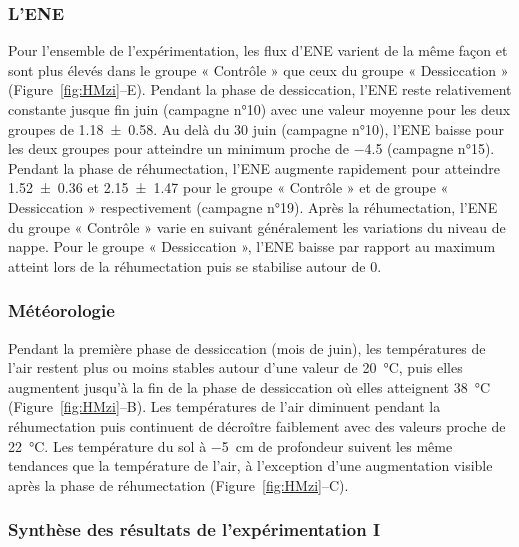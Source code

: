 \subsubsection{L'ENE}

Pour l'ensemble de l'expérimentation, les flux d'ENE varient de la même façon et sont plus élevés dans le groupe « Contrôle » que ceux du groupe « Dessiccation » (Figure~\ref{fig:HMzi}--E).
Pendant la phase de dessiccation, l'ENE reste relativement constante jusque fin juin (campagne n°10) avec une valeur moyenne pour les deux groupes de \SI{1.18(058)}{\uml}.
Au delà du 30 juin (campagne n°10), l'ENE baisse pour les deux groupes pour atteindre un minimum proche de \SI{-4.5}{\uml} (campagne n°15).
Pendant la phase de réhumectation, l'ENE augmente rapidement pour atteindre \num{1.52(036)} et \SI{2.15(147)}{\uml} pour le groupe « Contrôle » et de groupe « Dessiccation » respectivement (campagne n°19).
Après la réhumectation, l'ENE du groupe « Contrôle » varie en suivant généralement les variations du niveau de nappe.
Pour le groupe « Dessiccation », l'ENE baisse par rapport au maximum atteint lors de la réhumectation puis se stabilise autour de 0.

\subsubsection{Météorologie}

Pendant la première phase de dessiccation (mois de juin), les températures de l'air restent plus ou moins stables autour d'une valeur de \SI{20}{\degreeCelsius}, puis elles augmentent jusqu'à la fin de la phase de dessiccation où elles atteignent \SI{38}{\degreeCelsius} (Figure~\ref{fig:HMzi}--B).
Les températures de l'air diminuent pendant la réhumectation puis continuent de décroître faiblement avec des valeurs proche de \SI{22}{\degreeCelsius}.
Les température du sol à \SI{-5}{\centi\metre} de profondeur suivent les même tendances que la température de l'air, à l'exception d'une augmentation visible après la phase de réhumectation (Figure~\ref{fig:HMzi}--C).


\subsubsection{Synthèse des résultats de l'expérimentation I}


